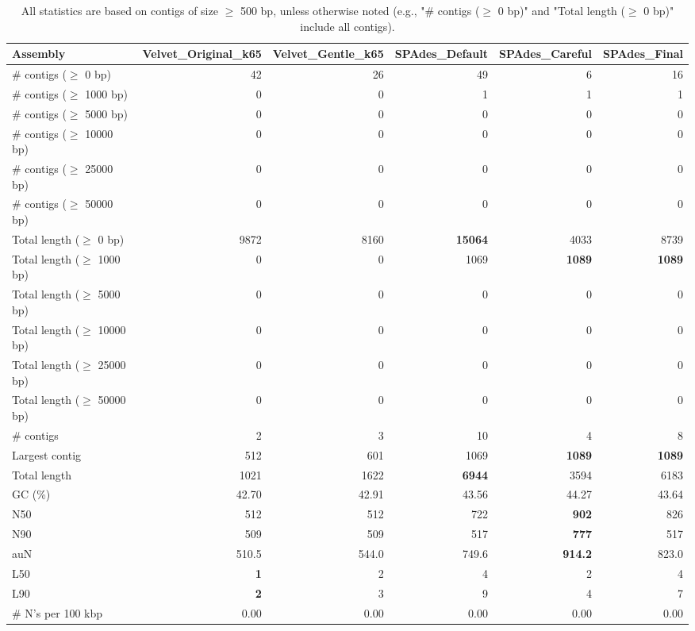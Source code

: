 \documentclass[12pt,a4paper]{article}
\begin{document}
\begin{table}[ht]
\begin{center}
\caption{All statistics are based on contigs of size $\geq$ 500 bp, unless otherwise noted (e.g., "\# contigs ($\geq$ 0 bp)" and "Total length ($\geq$ 0 bp)" include all contigs).}
\begin{tabular}{|l*{5}{|r}|}
\hline
Assembly & Velvet\_Original\_k65 & Velvet\_Gentle\_k65 & SPAdes\_Default & SPAdes\_Careful & SPAdes\_Final \\ \hline
\# contigs ($\geq$ 0 bp) & 42 & 26 & 49 & 6 & 16 \\ \hline
\# contigs ($\geq$ 1000 bp) & 0 & 0 & 1 & 1 & 1 \\ \hline
\# contigs ($\geq$ 5000 bp) & 0 & 0 & 0 & 0 & 0 \\ \hline
\# contigs ($\geq$ 10000 bp) & 0 & 0 & 0 & 0 & 0 \\ \hline
\# contigs ($\geq$ 25000 bp) & 0 & 0 & 0 & 0 & 0 \\ \hline
\# contigs ($\geq$ 50000 bp) & 0 & 0 & 0 & 0 & 0 \\ \hline
Total length ($\geq$ 0 bp) & 9872 & 8160 & {\bf 15064} & 4033 & 8739 \\ \hline
Total length ($\geq$ 1000 bp) & 0 & 0 & 1069 & {\bf 1089} & {\bf 1089} \\ \hline
Total length ($\geq$ 5000 bp) & 0 & 0 & 0 & 0 & 0 \\ \hline
Total length ($\geq$ 10000 bp) & 0 & 0 & 0 & 0 & 0 \\ \hline
Total length ($\geq$ 25000 bp) & 0 & 0 & 0 & 0 & 0 \\ \hline
Total length ($\geq$ 50000 bp) & 0 & 0 & 0 & 0 & 0 \\ \hline
\# contigs & 2 & 3 & 10 & 4 & 8 \\ \hline
Largest contig & 512 & 601 & 1069 & {\bf 1089} & {\bf 1089} \\ \hline
Total length & 1021 & 1622 & {\bf 6944} & 3594 & 6183 \\ \hline
GC (\%) & 42.70 & 42.91 & 43.56 & 44.27 & 43.64 \\ \hline
N50 & 512 & 512 & 722 & {\bf 902} & 826 \\ \hline
N90 & 509 & 509 & 517 & {\bf 777} & 517 \\ \hline
auN & 510.5 & 544.0 & 749.6 & {\bf 914.2} & 823.0 \\ \hline
L50 & {\bf 1} & 2 & 4 & 2 & 4 \\ \hline
L90 & {\bf 2} & 3 & 9 & 4 & 7 \\ \hline
\# N's per 100 kbp & 0.00 & 0.00 & 0.00 & 0.00 & 0.00 \\ \hline
\end{tabular}
\end{center}
\end{table}
\end{document}

